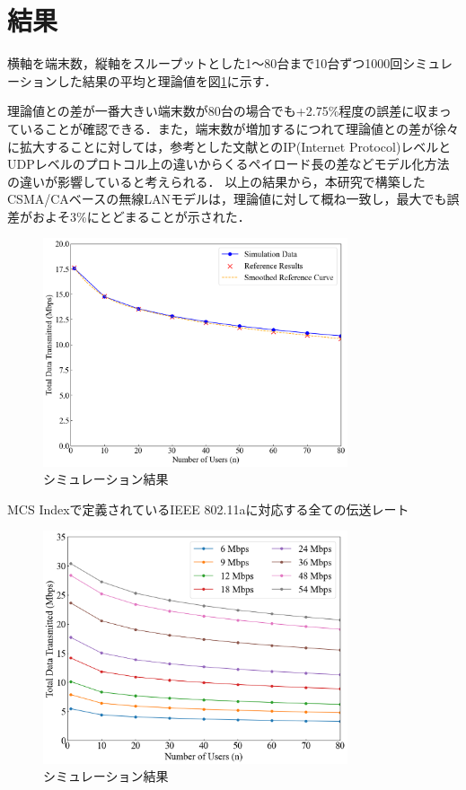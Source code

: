 \documentclass[a4paper,10pt]{ltjsarticle}
\begin{document}
\clearpage
\section{結果}
横軸を端末数，縦軸をスループットとした1～80台まで10台ずつ1000回シミュレーションした結果の平均と理論値を図\ref{fig:simulation-result-a}に示す．



理論値との差が一番大きい端末数が80台の場合でも+2.75\%程度の誤差に収まっていることが確認できる．また，端末数が増加するにつれて理論値との差が徐々に拡大することに対しては，参考とした文献\cite{paper}とのIP(Internet Protocol)レベルとUDPレベルのプロトコル上の違いからくるペイロード長の差などモデル化方法の違いが影響していると考えられる．
以上の結果から，本研究で構築したCSMA/CAベースの無線LANモデルは，理論値に対して概ね一致し，最大でも誤差がおよそ3\%にとどまることが示された．

\begin{figure}[H]
  \centering
  \includegraphics[width=0.8\textwidth]{./assets/g3.png}
  \caption{シミュレーション結果}
  \label{fig:simulation-result-a}
\end{figure}

MCS Indexで定義されているIEEE 802.11aに対応する全ての伝送レート


\begin{figure}[H]
  \centering
  \includegraphics[width=0.8\textwidth]{./assets/mcs_index.png}
  \caption{シミュレーション結果}
  \label{fig:simulation-result-mcs-index}
\end{figure}
\end{document}
